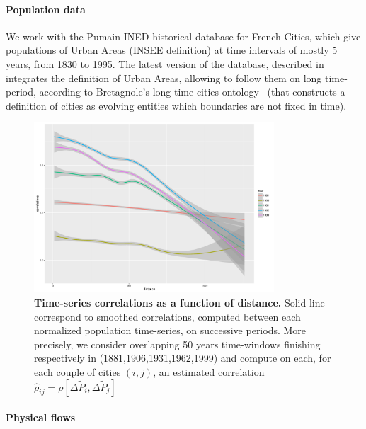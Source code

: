 \documentclass[Royal,sageh,times]{sagej}
\begin{document}
\paragraph{Population data}

We work with the Pumain-INED historical database for French Cities, which give populations of Urban Areas (INSEE definition)%
at time intervals of mostly 5 years, from 1830 to 1995. %
The latest version of the database, described in~\cite{}%
integrates the definition of Urban Areas, allowing to follow them on long time-period, according to Bretagnole's long time cities ontology~\cite{bretagnolle:tel-00459720} (that constructs a definition of cities as evolving entities which boundaries are not fixed in time).







\begin{figure}
\centering
\includegraphics[width=0.8\textwidth]{figures/empirical_tsCorrelations}
\caption{\textbf{Time-series correlations as a function of distance.} Solid line correspond to smoothed correlations, computed between each normalized population time-series, on successive periods. More precisely, we consider overlapping 50 years time-windows finishing respectively in (1881,1906,1931,1962,1999) and compute on each, for each couple of cities $(i,j)$, an estimated correlation $\hat{\rho}_{ij}=\rho\left[\Delta \tilde{P}_i, \Delta \tilde{P}_j\right]$}
\end{figure}


\paragraph{Physical flows}
\end{document}
